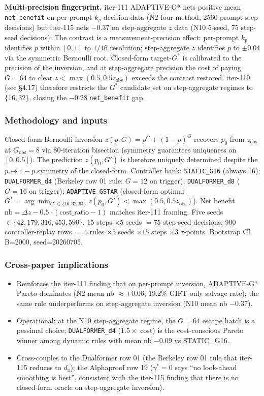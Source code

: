 \textbf{Multi-precision fingerprint.} iter-111 ADAPTIVE-G* nets positive
mean \texttt{net\_benefit} on per-prompt $k_p$ decision data (N2
four-method, 2560 prompt-step decisions) but iter-115 nets $-0.37$ on
step-aggregate $z$ data (N10 5-seed, 75 step-seed decisions). The
contrast is a measurement-precision effect: per-prompt $k_p$
identifies $p$ within $[0,1]$ to $1/16$ resolution; step-aggregate $z$
identifies $p$ to $\pm 0.04$ via the symmetric Bernoulli root.
Closed-form target-$G^*$ is calibrated to the precision of the
inversion, and at step-aggregate precision the cost of paying $G=64$
to clear $z<\max(0.5, 0.5z_{\mathrm{obs}})$ exceeds the contrast
restored. iter-119 (see §4.17) therefore restricts the
$G^*$ candidate set on step-aggregate regimes to $\{16, 32\}$,
closing the $-0.28$ \texttt{net\_benefit} gap.

\subsubsection*{Methodology and inputs}
Closed-form Bernoulli inversion $z(p,G)=p^G+(1-p)^G$ recovers
$p_0$ from $z_{\mathrm{obs}}$ at $G_{\mathrm{obs}}=8$ via 80-iteration
bisection (symmetry guarantees uniqueness on $[0,0.5]$). The
prediction $z(p_0, G')$ is therefore uniquely determined despite the
$p \leftrightarrow 1-p$ symmetry of the closed-form. Controller bank:
\texttt{STATIC\_G16} (always 16); \texttt{DUALFORMER\_d4}
(Berkeley row 01 rule: $G=12$ on trigger); \texttt{DUALFORMER\_d8}
($G=16$ on trigger); \texttt{ADAPTIVE\_GSTAR} (closed-form optimal
$G^*=\arg\min_{G'\in\{16,32,64\}}z(p_0,G')<\max(0.5,0.5z_{\mathrm{obs}})$).
Net benefit $\mathrm{nb}=\Delta z - 0.5\cdot(\mathrm{cost\_ratio}-1)$
matches iter-111 framing. Five seeds $\in\{42,179,316,453,590\}$, 15
steps $\times 5$ seeds $=75$ step-seed decisions; 900 controller-replay
rows $=4$ rules $\times 5$ seeds $\times 15$ steps $\times 3$
$\tau$-points. Bootstrap CI B=2000, seed=20260705.

\subsubsection*{Cross-paper implications}
\begin{itemize}
\item Reinforces the iter-111 finding that on per-prompt inversion,
  ADAPTIVE-G* Pareto-dominates (N2 mean nb $\approx+0.06$,
  $19.2\%$ GIFT-only salvage rate); the same rule underperforms on
  step-aggregate inversion (N10 mean nb $-0.37$).
\item Operational: at the N10 step-aggregate regime, the $G=64$
  escape hatch is a pessimal choice; \texttt{DUALFORMER\_d4}
  ($1.5\times$ cost) is the cost-conscious Pareto winner among
  dynamic rules with mean nb $-0.09$ vs STATIC\_G16.
\item Cross-couples to the Dualformer row 01 (the Berkeley row 01
  rule that iter-115 reduces to $d_4$); the Alphaproof row 19
  ($\gamma^*=0$ says ``no look-ahead smoothing is best'', consistent
  with the iter-115 finding that there is no closed-form oracle on
  step-aggregate inversion).
\end{itemize}
